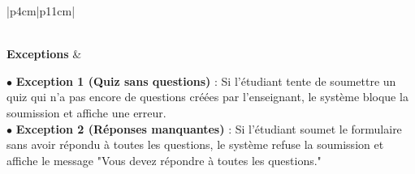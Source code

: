 \documentclass[12pt,a4paper]{report}
\begin{document}
\begin{table}[H]
\begin{tabular}{|p{4cm}|p{11cm}|}
\begin{minipage}[t]{\linewidth}
\vspace{0.1cm}
\end{minipage} \\
\hline
\textbf{Exceptions} & 
\begin{minipage}[t]{\linewidth}
$\bullet$ \textbf{Exception 1 (Quiz sans questions)} : Si l'étudiant tente de soumettre un quiz qui n'a pas encore de questions créées par l'enseignant, le système bloque la soumission et affiche une erreur.\\
$\bullet$ \textbf{Exception 2 (Réponses manquantes)} : Si l'étudiant soumet le formulaire sans avoir répondu à toutes les questions, le système refuse la soumission et affiche le message "Vous devez répondre à toutes les questions."
\vspace{0.1cm}
\end{minipage} \\
\hline
\end{tabular}
\end{table}
\end{document}
